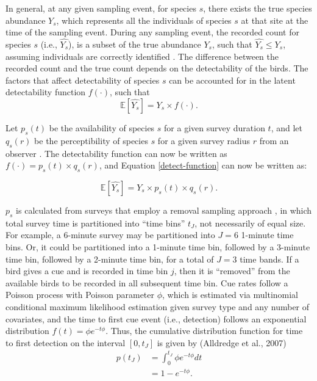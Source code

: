 \par In general, at any given sampling event, for species $s$, there exists the true species abundance $Y_s$, which represents all the individuals of species $s$ at that site at the time of the sampling event. During any sampling event, the recorded count for species $s$ (i.e., $\hat{Y_s}$), is a subset of the true abundance $Y_s$, such that $\hat{Y_s} \leq Y_s$, assuming individuals are correctly identified \citep{bennett_how_nodate, johnson_defense_2008}. The difference between the recorded count and the true count depends on the detectability of the birds. The factors that affect detectability of species $s$ can be accounted for in the latent detectability function $f(\cdot)$, such that
\begin{equation}\label{detect-function}
	\mathbb{E}\left[\hat{Y_s}\right] = Y_s \times f(\cdot).
\end{equation}

\par Let $p_s(t)$ be the availability of species $s$ for a given survey duration $t$, and let $q_s(r)$ be the perceptibility of species $s$ for a given survey radius $r$ from an observer \citep{solymos_calibrating_2013}. The detectability function can now be written as $f(\cdot) = p_s(t) \times q_s(r)$, and Equation \ref{detect-function} can now be written as:

\begin{equation*}
	\mathbb{E}\left[\hat{Y_s}\right] = Y_s \times p_s(t) \times q_s(r).
\end{equation*}

\par $p_s$ is calculated from surveys that employ a removal sampling approach \citep{alldredge_time--detection_2007, farnsworth_removal_2002, solymos_evaluating_2018}, in which total survey time is partitioned into “time bins” $t_J$, not necessarily of equal size. For example, a 6-minute survey may be partitioned into $J = 6$ 1-minute time bins. Or, it could be partitioned into a 1-minute time bin, followed by a 3-minute time bin, followed by a 2-minute time bin, for a total of $J = 3$ time bands. If a bird gives a cue and is recorded in time bin $j$, then it is “removed” from the available birds to be recorded in all subsequent time bin. Cue rates follow a Poisson process with Poisson parameter $\phi$, which is estimated via multinomial conditional maximum likelihood estimation given survey type and any number of covariates, and the time to first cue event (i.e., detection) follows an exponential distribution $f(t) = \phi e^{-t\phi}$. Thus, the cumulative distribution function for time to first detection on the interval $\left[0, t_J\right]$ is given by (Alldredge et al., 2007)
\begin{align*}
	p(t_J) &= \int_{0}^{t_J} \phi e^{-t\phi} dt \\
	&= 1 - e^{-t\phi}.
\end{align*}

